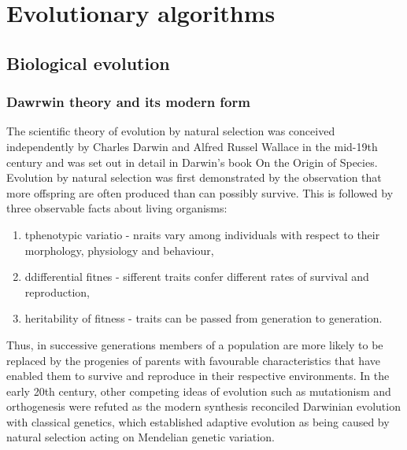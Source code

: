 \chapter{Evolutionary algorithms}


\section{Biological evolution}

\subsection{Dawrwin theory and its modern form}
The scientific theory of evolution by natural selection was conceived independently by
Charles Darwin and Alfred Russel Wallace in the mid-19th century and was set out in detail in
Darwin's book On the Origin of Species.
Evolution by natural selection was first demonstrated by the observation that more offspring are
often produced than can possibly survive. 
This is followed by three observable facts about living organisms:
\begin{enumerate}
	\item  tphenotypic variatio - nraits vary among individuals with respect to their morphology,
		physiology and behaviour, 
	\item ddifferential fitnes - sifferent traits confer different rates of survival 
		and reproduction, 
	\item heritability of fitness - traits can be passed from generation to generation.
\end{enumerate}
Thus, in successive generations members of a population are more likely to be replaced by
the progenies of parents with favourable characteristics that have enabled them to survive and 
reproduce in their respective environments. 
In the early 20th century, other competing ideas of evolution such as mutationism and orthogenesis
were refuted as the modern synthesis reconciled Darwinian evolution with classical genetics,
which established adaptive evolution as being caused by natural selection acting on
Mendelian genetic variation.

